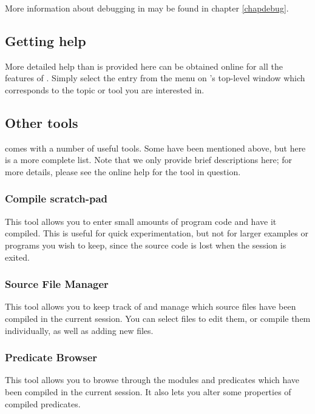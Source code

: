 More information about debugging in {\eclipse} may be found in chapter
\ref{chapdebug}.

\subsection{Getting help}

More detailed help than is provided here can be obtained online for all
the features of {\tkeclipse}.
Simply select the entry from the  menu on {\tkeclipse}'s
top-level window which corresponds to the topic or tool you are interested
in.

\subsection{Other tools}

{\tkeclipse} comes with a number of useful tools.
Some have been mentioned above, but here is a more complete list.
Note that we only provide brief descriptions here; for more details, please
see the online help for the tool in question.

\subsubsection{Compile scratch-pad}

This tool allows you to enter small amounts of program code and have it
compiled.
This is useful for quick experimentation, but not for larger examples or
programs you wish to keep, since the source code is lost when the session is
exited.

\subsubsection{Source File Manager}

This tool allows you to keep track of and manage which source files have
been compiled in the current {\eclipse} session.
You can select files to edit them, or compile them individually, as well as
adding new files.

\subsubsection{Predicate Browser}

This tool allows you to browse through the modules and predicates which have
been compiled in the current session.
It also lets you alter some properties of compiled predicates.

